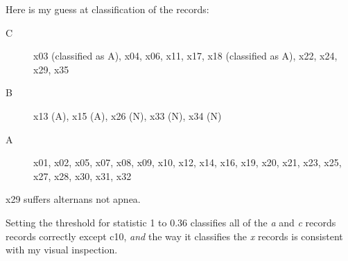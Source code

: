 \documentclass[12pt]{article}
\begin{document}
Here is my guess at classification of the records:
\begin{description}
\item[C]
  x03 (classified as A),
  x04,
  x06,
  x11,
  x17,
  x18 (classified as A),
  x22,
  x24,
  x29,
  x35
\item[B]
  x13 (A),
  x15 (A),
  x26 (N),
  x33 (N),
  x34 (N)
\item[A]
  x01, x02, x05, x07, x08, x09, x10, x12, x14, x16, x19, x20,
  x21, x23, x25, x27, x28, x30, x31, x32
\end{description}

x29 suffers alternans not apnea.

Setting the threshold for statistic 1 to 0.36 classifies all of the
\emph{a} and \emph{c} records records correctly except c10, \emph{and}
the way it classifies the \emph{x} records is consistent with my
visual inspection.
\end{document}
